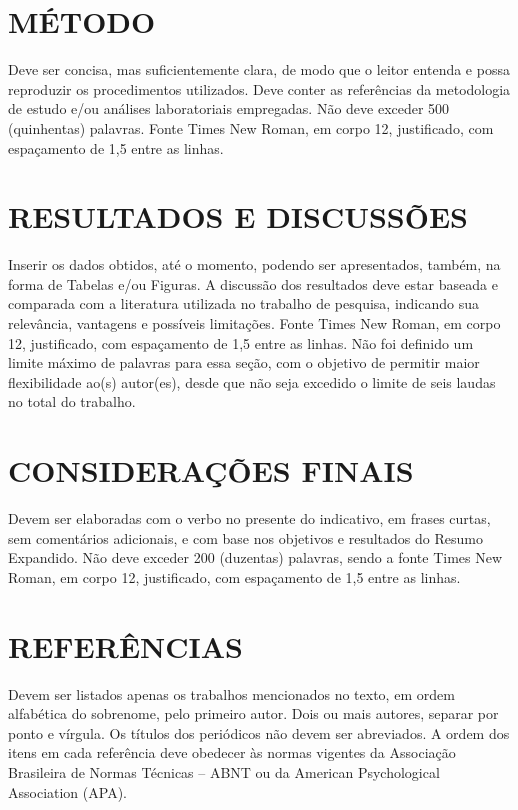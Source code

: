 \documentclass[12pt]{article}
\begin{document}
\section*{MÉTODO}

Deve ser concisa, mas suficientemente clara, de modo que o leitor entenda e possa reproduzir os procedimentos utilizados. Deve conter as referências da metodologia de estudo e/ou análises laboratoriais empregadas. Não deve exceder 500 (quinhentas) palavras. Fonte Times New Roman, em corpo 12, justificado, com espaçamento de 1,5 entre as linhas.

\section*{RESULTADOS E DISCUSSÕES}

Inserir os dados obtidos, até o momento, podendo ser apresentados, também, na forma de Tabelas e/ou Figuras. A discussão dos resultados deve estar baseada e comparada com a literatura utilizada no trabalho de pesquisa, indicando sua relevância, vantagens e possíveis limitações. Fonte Times New Roman, em corpo 12, justificado, com espaçamento de 1,5 entre as linhas. Não foi definido um limite máximo de palavras para essa seção, com o objetivo de permitir maior flexibilidade ao(s) autor(es), desde que não seja excedido o limite de seis laudas no total do trabalho.

\section*{CONSIDERAÇÕES FINAIS}

Devem ser elaboradas com o verbo no presente do indicativo, em frases curtas, sem comentários adicionais, e com base nos objetivos e resultados do Resumo Expandido. Não deve exceder 200 (duzentas) palavras, sendo a fonte Times New Roman, em corpo 12, justificado, com espaçamento de 1,5 entre as linhas.

\section*{REFERÊNCIAS}

Devem ser listados apenas os trabalhos mencionados no texto, em ordem alfabética do sobrenome, pelo primeiro autor. Dois ou mais autores, separar por ponto e vírgula. Os títulos dos periódicos não devem ser abreviados. A ordem dos itens em cada referência deve obedecer às normas vigentes da Associação Brasileira de Normas Técnicas – ABNT ou da American Psychological Association (APA).
\end{document}
